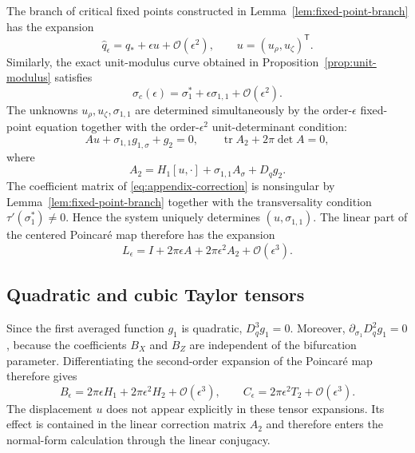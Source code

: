 \documentclass[11pt]{amsart}
\theoremstyle{remark}
\newcommand{\tr}{\operatorname{tr}}
\newcommand{\cO}{\mathcal{O}}
\begin{document}
The branch of critical fixed points constructed in
Lemma~\ref{lem:fixed-point-branch} has the expansion
\[
 \widehat q_\epsilon=q_*+\epsilon u+\cO(\epsilon^2),
 \qquad u=(u_\rho,u_\zeta)^{\mathsf T}.
\]
Similarly, the exact unit-modulus curve obtained in
Proposition~\ref{prop:unit-modulus} satisfies
\[
 \sigma_c(\epsilon)=\sigma_1^*+\epsilon\sigma_{1,1}+\cO(\epsilon^2).
\]
The unknowns \(u_\rho,u_\zeta,\sigma_{1,1}\) are determined simultaneously by
the order-\(\epsilon\) fixed-point equation together with the
order-\(\epsilon^2\) unit-determinant condition:
\begin{equation}\label{eq:appendix-correction}
 Au+\sigma_{1,1}g_{1,\sigma}+g_2=0,
 \qquad
 \tr A_2+2\pi\det A=0,
\end{equation}
where
\begin{equation}\label{eq:appendix-A2}
 A_2=H_1[u,\cdot]+\sigma_{1,1}A_\sigma+D_qg_2.
\end{equation}
The coefficient matrix of \eqref{eq:appendix-correction} is nonsingular by
Lemma~\ref{lem:fixed-point-branch} together with the transversality condition
\(\tau'(\sigma_1^*)\ne0\).  Hence the system uniquely determines
\((u,\sigma_{1,1})\).  The linear part of the centered Poincar\'e map
therefore has the expansion
\begin{equation}\label{eq:appendix-linear}
 L_\epsilon=I+2\pi\epsilon A+2\pi\epsilon^2A_2+\cO(\epsilon^3).
\end{equation}

\subsection{Quadratic and cubic Taylor tensors}

Since the first averaged function \(g_1\) is quadratic,
\(D_q^3g_1=0\).  Moreover,
\(\partial_{\sigma_1}D_q^2g_1=0\), because the coefficients \(B_X\) and
\(B_Z\) are independent of the bifurcation parameter.  Differentiating the
second-order expansion of the Poincar\'e map therefore gives
\begin{equation}\label{eq:appendix-tensors}
 B_\epsilon=2\pi\epsilon H_1+2\pi\epsilon^2H_2+\cO(\epsilon^3),
 \qquad
 C_\epsilon=2\pi\epsilon^2T_2+\cO(\epsilon^3).
\end{equation}
The displacement \(u\) does not appear explicitly in these tensor
expansions.  Its effect is contained in the linear correction matrix
\(A_2\) and therefore enters the normal-form calculation through the linear
conjugacy.
\end{document}

